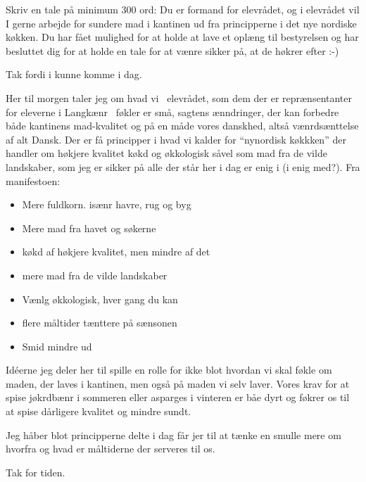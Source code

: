 \documentclass{article}
\begin{document}
Skriv en tale p\aa{} minimum 300 ord: Du er formand for elevr\aa{}det, og i elevr\aa{}det vil I gerne arbejde for sundere mad i kantinen ud fra principperne i det nye nordiske k\o{}kken. Du har f\aa{}et mulighed for at holde at lave et opl\ae{}ng til bestyrelsen og har besluttet dig for at holde en tale for at v\ae{}nre sikker p\aa{}, at de h\o{}krer efter :-)

\vspace{3cm}

Tak fordi i kunne komme i dag.

Her til morgen taler jeg om hvad vi \textendash\ elevr\aa{}det, som dem der er repr\ae{}nsentanter for eleverne i Langk\ae{}nr \textendash\ f\o{}kler er sm\aa{}, sagtens \ae{}nndringer, der kan forbedre b\aa{}de kantinens mad-kvalitet og p\aa{} en m\aa{}de vores danskhed, alts\aa{} v\ae{}nrds\ae{}nttelse af alt Dansk. Der er f\aa{} principper i hvad vi kalder for ``nynordisk k\o{}kkken'' der handler om h\o{}kjere kvalitet k\o{}kd og \o{}kkologisk s\aa{}vel som mad fra de vilde landskaber, som jeg er sikker p\aa{} alle der st\aa{}r her i dag er enig i (i enig med?). Fra manifestoen:
\begin{itemize}
	\item Mere fuldkorn. is\ae{}nr havre, rug og byg
	\item Mere mad fra havet og s\o{}kerne
	\item k\o{}kd af h\o{}kjere kvalitet, men mindre af det
	\item mere mad fra de vilde landskaber
	\item V\ae{}nlg \o{}kkologisk, hver gang du kan
	\item flere m\aa{}ltider t\ae{}nttere p\aa{} s\ae{}nsonen
	\item Smid mindre ud
\end{itemize}

Id\'{e}erne jeg deler her til spille en rolle for ikke blot hvordan vi skal f\o{}kle om maden, der laves i kantinen, men ogs\aa{} p\aa{} maden vi selv laver. Vores krav for at spise j\o{}krdb\ae{}nr i sommeren eller asparges i vinteren er b\aa{}e dyrt og f\o{}krer os til at spise d\aa{}rligere kvalitet og mindre sundt.

Jeg h\aa{}ber blot principperne delte i dag f\aa{}r jer til at t\ae{}nke en smulle mere om hvorfra og hvad er m\aa{}ltiderne der serveres til os.

Tak for tiden.
\end{document}
